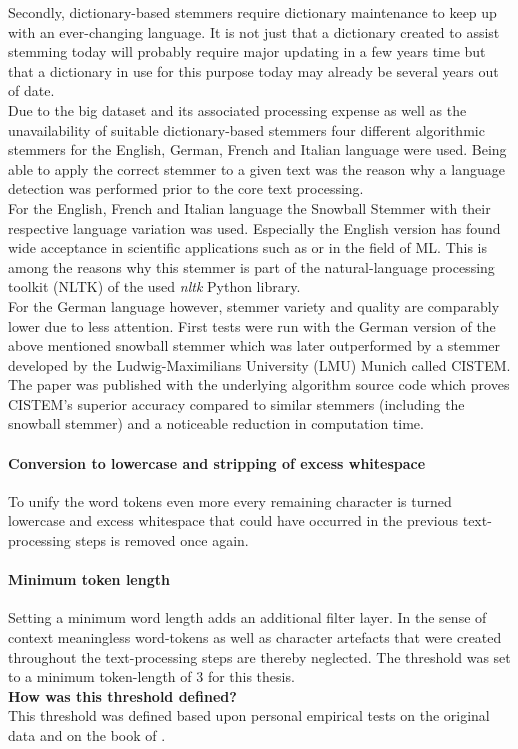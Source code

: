 Secondly, dictionary-based stemmers require dictionary maintenance to keep up with an ever-changing language. It is not just that a dictionary created to assist stemming today will probably require major updating in a few years time but that a dictionary in use for this purpose today may already be several years out of date.\\
Due to the big dataset and its associated processing expense as well as the unavailability of suitable dictionary-based stemmers four different algorithmic stemmers for the English, German, French and Italian language were used. Being able to apply the correct stemmer to a given text was the reason why a language detection was performed prior to the core text processing.\\
For the English, French and Italian language the Snowball Stemmer \parencite{Porter2001} with their respective language variation was used. Especially the English version has found wide acceptance in scientific applications such as \parencite{Krauthammer2011} or \parencite{Joulin2016} in the field of ML. This is among the reasons why this stemmer is part of the natural-language processing toolkit (NLTK) \parencite{Manning2014} of the used \textit{nltk} Python library.\\
For the German language however, stemmer variety and quality are comparably lower due to less attention. First tests were run with the German version of the above mentioned snowball stemmer which was later outperformed by a stemmer developed by the Ludwig-Maximilians University (LMU) Munich called CISTEM. The paper \parencite{Weissweiler2018} was published with the underlying algorithm source code which proves CISTEM's superior accuracy compared to similar stemmers (including the snowball stemmer) and a noticeable reduction in computation time.

\paragraph*{Conversion to lowercase and stripping of excess whitespace}
To unify the word tokens even more every remaining character is turned lowercase and excess whitespace that could have occurred in the previous text-processing steps is removed once again.

\paragraph*{Minimum token length}
Setting a minimum word length adds an additional filter layer. In the sense of context meaningless word-tokens as well as character artefacts that were created throughout the text-processing steps are thereby neglected. The threshold was set to a minimum token-length of 3 for this thesis.\\
\newline
\textbf{How was this threshold defined?}\\
\newline
This threshold was defined based upon personal empirical tests on the original data and on the book of \parencite{Guido2016}.

